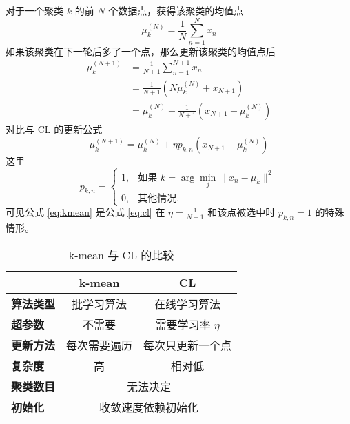         对于一个聚类 $k$ 的前 $N$ 个数据点，获得该聚类的均值点
        \begin{equation}
            \mu^{(N)}_k=\frac{1}{N}\sum_{n=1}^Nx_n
        \end{equation}
        如果该聚类在下一轮后多了一个点，那么更新该聚类的均值点后
        \begin{align}
            \mu^{(N+1)}_k&=\frac{1}{N+1}\sum_{n=1}^{N+1}x_n \nonumber\\
            &=\frac{1}{N+1}\left(N\mu^{(N)}_k+x_{N+1}\right)\nonumber\\
            &=\mu^{(N)}_k+\frac{1}{N+1}\left(x_{N+1}-\mu^{(N)}_k\right)\label{eq:kmean}
        \end{align}
        对比与 CL 的更新公式
        \begin{equation}
            \mu^{(N+1)}_k = \mu^{(N)}_k + \eta p_{k,n}\left(x_{N+1}-\mu^{(N)}_k\right)\label{eq:cl}
        \end{equation}
        这里
        \begin{equation}
            p_{k,n}=\begin{cases}
                1, & \text{如果 }k=\arg\min_j\|x_n-\mu_k\|^2\\
                0, & \text{其他情况}.
            \end{cases}\label{eq:clcond}
        \end{equation}
        可见公式 \eqref{eq:kmean} 是公式 \eqref{eq:cl} 在 $\eta=\frac{1}{N+1}$ 和该点被选中时 $p_{k,n}=1$ 的特殊情形。

        \begin{table}
            \centering
            \caption{k-mean 与 CL 的比较}\label{tab:comp}
            \begin{tabular}{>{\bfseries}lcc}
                \toprule
                   & k-mean & CL \\
                \midrule
                算法类型 & 批学习算法 & 在线学习算法 \\
                超参数 & 不需要 & 需要学习率 $\eta$ \\
                更新方法 & 每次需要遍历 & 每次只更新一个点 \\
                复杂度 & 高 & 相对低 \\
                \midrule
                聚类数目 & \multicolumn{2}{c}{无法决定} \\
                初始化 & \multicolumn{2}{c}{收敛速度依赖初始化} \\
                \bottomrule
            \end{tabular}
        \end{table}

